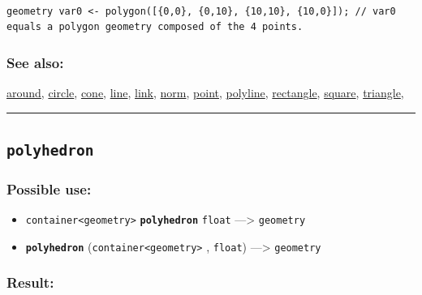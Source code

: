 \documentclass[]{book}
\providecommand{\tightlist}{%
  \setlength{\itemsep}{0pt}\setlength{\parskip}{0pt}}
\theoremstyle{definition}
\theoremstyle{definition}
\theoremstyle{definition}
\theoremstyle{remark}
\begin{document}
\begin{verbatim}
 
geometry var0 <- polygon([{0,0}, {0,10}, {10,10}, {10,0}]); // var0 equals a polygon geometry composed of the 4 points.
\end{verbatim}

\subsubsection{See also:}\label{see-also-166}

\href{operators-a-to-a.html\#around}{around},
\href{operators-b-to-c.html\#circle}{circle},
\href{operators-b-to-c.html\#cone}{cone},
\href{operators-i-to-m.html\#line}{line},
\href{operators-i-to-m.html\#link}{link},
\href{operators-n-to-r.html\#norm}{norm},
\href{operators-n-to-r.html\#point}{point},
\href{operators-n-to-r.html\#polyline}{polyline},
\href{operators-n-to-r.html\#rectangle}{rectangle},
\href{operators-s-to-z.html\#square}{square},
\href{operators-s-to-z.html\#triangle}{triangle},

\begin{center}\rule{0.5\linewidth}{\linethickness}\end{center}

\subsection{\texorpdfstring{\texttt{polyhedron}}{polyhedron}}\label{polyhedron}

\subsubsection{Possible use:}\label{possible-use-414}

\begin{itemize}
\tightlist
\item
  \texttt{container\textless{}geometry\textgreater{}}
  \textbf{\texttt{polyhedron}} \texttt{float} ---\textgreater{}
  \texttt{geometry}
\item
  \textbf{\texttt{polyhedron}}
  (\texttt{container\textless{}geometry\textgreater{}} , \texttt{float})
  ---\textgreater{} \texttt{geometry}
\end{itemize}

\subsubsection{Result:}\label{result-400}
\end{document}
